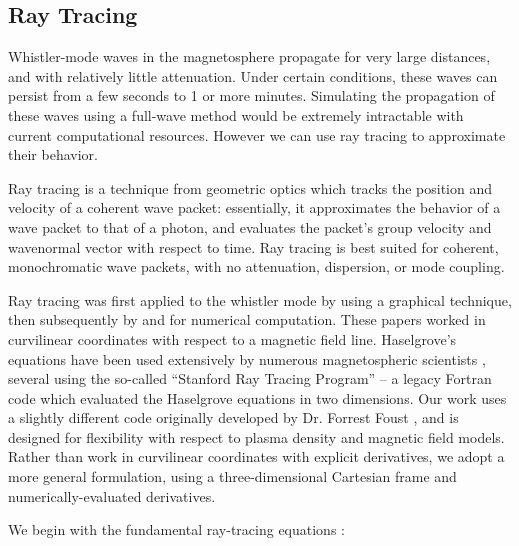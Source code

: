 \label{section:raytracing}
\subsection{Ray Tracing}
Whistler-mode waves in the magnetosphere propagate for very large distances, and with relatively little attenuation. Under certain conditions, these waves can persist from a few seconds to 1 or more minutes. Simulating the propagation of these waves using a full-wave method would be extremely intractable with current computational resources. However we can use ray tracing to approximate their behavior.

Ray tracing is a technique from geometric optics which tracks the position and velocity of a coherent wave packet: essentially, it approximates the behavior of a wave packet to that of a photon, and evaluates the packet's group velocity and wavenormal vector with respect to time. Ray tracing is best suited for coherent, monochromatic wave packets, with no attenuation, dispersion, or mode coupling. 

Ray tracing was first applied to the whistler mode by \cite{Haselgrove1955} using a graphical technique, then subsequently by \cite{Haselgrove1960} and \cite{Kimura1966} for numerical computation. These papers worked in curvilinear coordinates with respect to a magnetic field line. Haselgrove's equations have been used extensively by numerous magnetospheric scientists \citep{Kimura1966, Edgar1972, Ngo1989,Ristic1993, Lauben1998, Peter2007, Bortnik2005, Kulkarni2009}, several using the so-called ``Stanford Ray Tracing Program'' -- a legacy Fortran code which evaluated the Haselgrove equations in two dimensions. Our work uses a slightly different code originally developed by Dr. Forrest Foust \citep{Golden2010}, and is designed for flexibility with respect to plasma density and magnetic field models. Rather than work in curvilinear coordinates with explicit derivatives, we adopt a more general formulation, using a three-dimensional Cartesian frame and numerically-evaluated derivatives.

We begin with the fundamental ray-tracing equations \citep{Haselgrove1960, Stix1992}:

